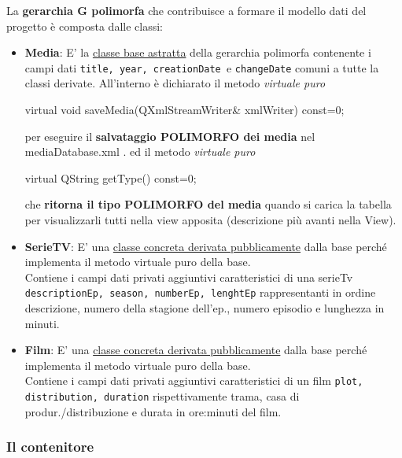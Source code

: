 \documentclass[10pt,a4paper,openany]{article}
\begin{document}
		La \textbf{gerarchia G polimorfa} che contribuisce a formare il modello dati del progetto è composta dalle classi:
	
		\begin{itemize}
	
			\item \textbf{Media}: E' la \underline{classe base astratta} della gerarchia polimorfa contenente i campi dati \texttt{title, year, 
			creationDate }e \texttt{changeDate} comuni a tutte la classi derivate.
			All'interno è dichiarato il metodo \textit{virtuale puro} 
			\begin{CPP}
			virtual void saveMedia(QXmlStreamWriter& xmlWriter) const=0;
			\end{CPP}		 
			per eseguire il \textbf{salvataggio POLIMORFO dei media} nel mediaDatabase.xml .
			ed il metodo \textit{virtuale puro}
			\begin{CPP}
			virtual QString getType() const=0;
			\end{CPP}
			che \textbf{ritorna il tipo POLIMORFO del media} quando si carica la tabella per visualizzarli tutti nella view apposita (descrizione più avanti nella View).
			\item \textbf{SerieTV}: E' una \underline{classe concreta derivata pubblicamente} dalla base perché implementa il metodo virtuale puro della base.\\
		 	Contiene i campi dati privati aggiuntivi caratteristici di una serieTv \texttt{descriptionEp, season, numberEp, lenghtEp} rappresentanti in ordine 
			descrizione, numero della stagione dell'ep., numero episodio e lunghezza in minuti.
		 	\item \textbf{Film}: E' una \underline{classe concreta derivata pubblicamente} dalla base perché implementa il metodo virtuale puro della base.\\
		 	Contiene i campi dati privati aggiuntivi caratteristici di un film \texttt{plot, distribution, duration} rispettivamente trama, casa di produr./distribuzione e 
			durata in ore:minuti del film.
	
		\end{itemize}
	
		\subsubsection{Il contenitore}
	
\end{document}
